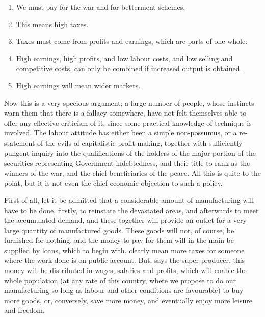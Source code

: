 \documentclass{book}
\begin{document}
\begin{enumerate}
	\item We must pay for the war and for betterment schemes.


	\item This means high taxes.


	\item Taxes must come from profits and earnings, which are parts of one whole.


	\item High earnings, high profits, and low labour costs, and low selling and competitive costs, can only be combined if increased output is obtained.


	\item High earnings will mean wider markets.



\end{enumerate}
Now this is a very specious argument; a large number of people, whose instincts warn them that there is a fallacy somewhere, have not felt themselves able to offer any effective criticism of it, since some practical knowledge of technique is involved. The labour attitude has either been a simple non-possumus, or a re-statement of the evils of capitalistic profit-making, together with sufficiently pungent inquiry into the qualifications of the holders of the major portion of the securities representing Government indebtedness, and their title to rank as the winners of the war, and the chief beneficiaries of the peace. All this is quite to the point, but it is not even the chief economic objection to such a policy.

First of all, let it be admitted that a considerable amount of manufacturing will have to be done, firstly, to reinstate the devastated areas, and afterwards to meet the accumulated demand, and these together will provide an outlet for a very large quantity of manufactured goods. These goods will not, of course, be furnished for nothing, and the money to pay for them will in the main be supplied by loans, which to begin with, clearly mean more taxes for someone where the work done is on public account. But, says the super-producer, this money will be distributed in wages, salaries and profits, which will enable the whole population (at any rate of this country, where we propose to do our manufacturing so long as labour and other conditions are favourable) to buy more goods, or, conversely, save more money, and eventually enjoy more leisure and freedom.
\end{document}
